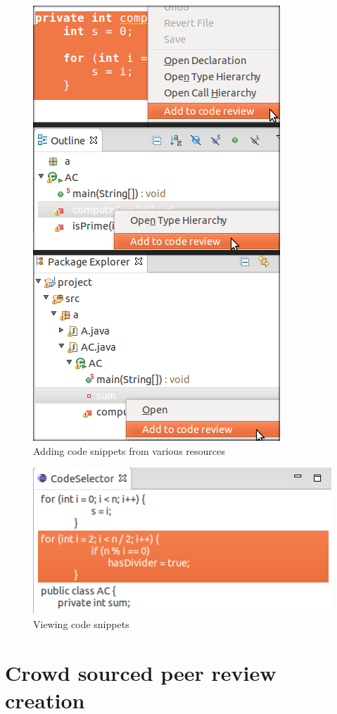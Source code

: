 \documentclass{sigchi}
\begin{document}
\begin{figure}[hbt]
	\centering
	\includegraphics[scale=0.4]{snippetSelections.png}
\caption{Adding code snippets from various resources}
\label{fig:snippetSelection}
\end{figure}

\begin{figure}[hbt]
	\centering
	\includegraphics[scale=0.45]{snippetViewer.png}
\caption{Viewing code snippets}
\label{fig:snippetViewer}
\end{figure}
 
\section{Crowd sourced peer review creation}
\end{document}
